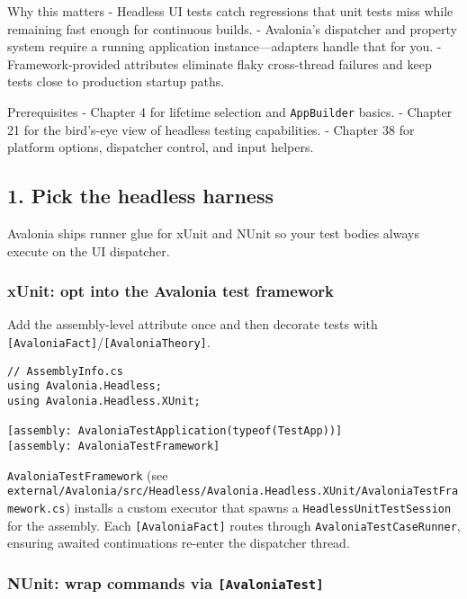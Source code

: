 Why this matters - Headless UI tests catch regressions that unit tests
miss while remaining fast enough for continuous builds. - Avalonia's
dispatcher and property system require a running application
instance---adapters handle that for you. - Framework-provided attributes
eliminate flaky cross-thread failures and keep tests close to production
startup paths.

Prerequisites - Chapter 4 for lifetime selection and
\passthrough{\lstinline!AppBuilder!} basics. - Chapter 21 for the
bird's-eye view of headless testing capabilities. - Chapter 38 for
platform options, dispatcher control, and input helpers.

\subsection{1. Pick the headless
harness}\label{pick-the-headless-harness}

Avalonia ships runner glue for xUnit and NUnit so your test bodies
always execute on the UI dispatcher.

\subsubsection{xUnit: opt into the Avalonia test
framework}\label{xunit-opt-into-the-avalonia-test-framework}

Add the assembly-level attribute once and then decorate tests with
\passthrough{\lstinline![AvaloniaFact]!}/\passthrough{\lstinline![AvaloniaTheory]!}.

\begin{lstlisting}
// AssemblyInfo.cs
using Avalonia.Headless;
using Avalonia.Headless.XUnit;

[assembly: AvaloniaTestApplication(typeof(TestApp))]
[assembly: AvaloniaTestFramework]
\end{lstlisting}

\passthrough{\lstinline!AvaloniaTestFramework!} (see
\passthrough{\lstinline!external/Avalonia/src/Headless/Avalonia.Headless.XUnit/AvaloniaTestFramework.cs!})
installs a custom executor that spawns a
\passthrough{\lstinline!HeadlessUnitTestSession!} for the assembly. Each
\passthrough{\lstinline![AvaloniaFact]!} routes through
\passthrough{\lstinline!AvaloniaTestCaseRunner!}, ensuring awaited
continuations re-enter the dispatcher thread.

\subsubsection{\texorpdfstring{NUnit: wrap commands via
\texttt{{[}AvaloniaTest{]}}}{NUnit: wrap commands via {[}AvaloniaTest{]}}}\label{nunit-wrap-commands-via-avaloniatest}

